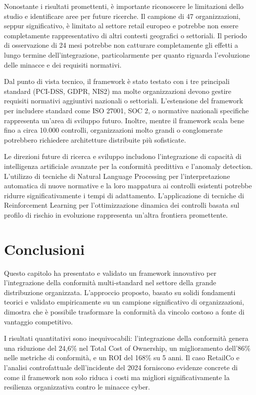 Nonostante i risultati promettenti, è importante riconoscere le limitazioni dello studio e identificare aree per future ricerche. Il campione di 47 organizzazioni, seppur significativo, è limitato al settore retail europeo e potrebbe non essere completamente rappresentativo di altri contesti geografici o settoriali. Il periodo di osservazione di 24 mesi potrebbe non catturare completamente gli effetti a lungo termine dell'integrazione, particolarmente per quanto riguarda l'evoluzione delle minacce e dei requisiti normativi.

Dal punto di vista tecnico, il framework è stato testato con i tre principali standard (PCI-DSS, GDPR, NIS2) ma molte organizzazioni devono gestire requisiti normativi aggiuntivi nazionali o settoriali. L'estensione del framework per includere standard come ISO 27001, SOC 2, o normative nazionali specifiche rappresenta un'area di sviluppo futuro. Inoltre, mentre il framework scala bene fino a circa 10.000 controlli, organizzazioni molto grandi o conglomerate potrebbero richiedere architetture distribuite più sofisticate.

Le direzioni future di ricerca e sviluppo includono l'integrazione di capacità di intelligenza artificiale avanzate per la conformità predittiva e l'anomaly detection. L'utilizzo di tecniche di Natural Language Processing per l'interpretazione automatica di nuove normative e la loro mappatura ai controlli esistenti potrebbe ridurre significativamente i tempi di adattamento. L'applicazione di tecniche di Reinforcement Learning per l'ottimizzazione dinamica dei controlli basata sul profilo di rischio in evoluzione rappresenta un'altra frontiera promettente.

\section{\texorpdfstring{Conclusioni}{4.7 - Conclusioni}}
\label{sec:4.7_conclusioni}

Questo capitolo ha presentato e validato un framework innovativo per l'integrazione della conformità multi-standard nel settore della grande distribuzione organizzata. L'approccio proposto, basato su solidi fondamenti teorici e validato empiricamente su un campione significativo di organizzazioni, dimostra che è possibile trasformare la conformità da vincolo costoso a fonte di vantaggio competitivo.

I risultati quantitativi sono inequivocabili: l'integrazione della conformità genera una riduzione del 24,6\% nel Total Cost of Ownership, un miglioramento dell'86\% nelle metriche di conformità, e un ROI del 168\% su 5 anni. Il caso RetailCo e l'analisi controfattuale dell'incidente del 2024 forniscono evidenze concrete di come il framework non solo riduca i costi ma migliori significativamente la resilienza organizzativa contro le minacce cyber.

